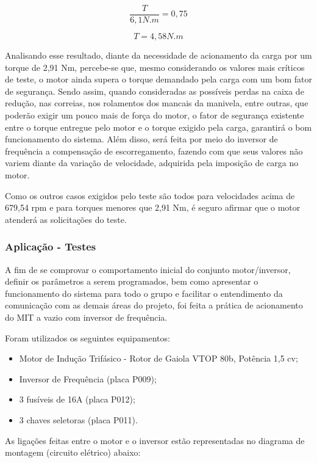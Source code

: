 	$$ \frac{T}{6,1 N.m} = 0,75 $$

	$$ T = 4,58 N.m $$

	Analisando esse resultado, diante da necessidade de acionamento da carga por um torque de 2,91 Nm, percebe-se que, mesmo considerando os valores mais críticos de teste, o motor ainda supera o torque demandado pela carga com um bom fator de segurança. Sendo assim, quando consideradas as possíveis perdas na caixa de redução, nas correias, nos rolamentos dos mancais da manivela, entre outras, que poderão exigir um pouco mais de força do motor, o fator de segurança existente entre o torque entregue pelo motor e o torque exigido pela carga, garantirá o bom funcionamento do sistema. Além disso, será feita por meio do inversor de frequência a compensação de escorregamento, fazendo com que seus valores não variem diante da variação de velocidade, adquirida pela imposição de carga no motor.

	Como os outros casos exigidos pelo teste são todos para velocidades acima de 679,54 rpm e para torques menores que 2,91 Nm, é seguro afirmar que o motor atenderá as solicitações do teste.


\subsubsection{Aplicação - Testes}
		

		A fim de se comprovar o comportamento inicial do conjunto motor/inversor, definir os parâmetros a serem programados, bem como apresentar o funcionamento do sistema para todo o grupo e facilitar o entendimento da comunicação com as demais áreas do projeto, foi feita a prática de acionamento do MIT a vazio com inversor de frequência.

		Foram utilizados os seguintes equipamentos:

		\begin{itemize}
			\item Motor de Indução Trifásico - Rotor de Gaiola VTOP 80b, Potência 1,5 cv;
			\item Inversor de Frequência (placa P009);
			\item 3 fusíveis de 16A (placa P012);
			\item 3 chaves seletoras (placa P011). 
		\end{itemize}

		As ligações feitas entre o motor e o inversor estão representadas no diagrama de montagem (circuito elétrico) abaixo:

